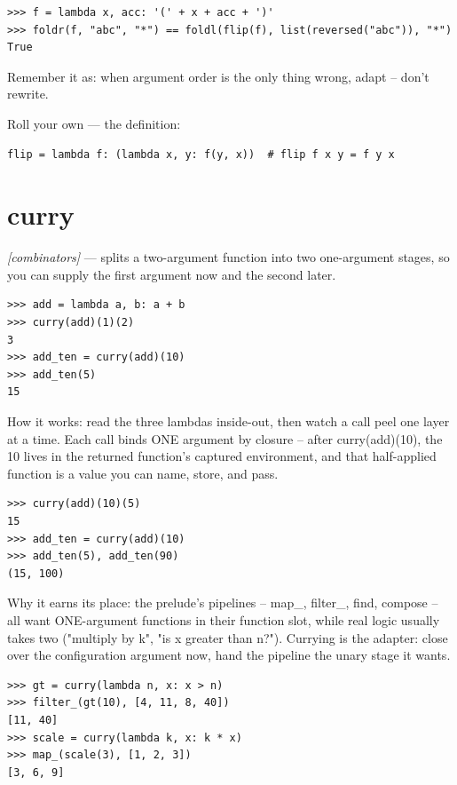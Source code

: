 \documentclass[11pt,letterpaper]{book}
\begin{document}
\begin{lstlisting}[style=spec]
>>> f = lambda x, acc: '(' + x + acc + ')'
>>> foldr(f, "abc", "*") == foldl(flip(f), list(reversed("abc")), "*")
True
\end{lstlisting}

Remember it as: when argument order is the only thing wrong, adapt -- don't rewrite.


Roll your own --- the definition:

\begin{lstlisting}[style=code]
flip = lambda f: (lambda x, y: f(y, x))  # flip f x y = f y x
\end{lstlisting}

\section{curry}
\noindent\textit{[combinators]} --- splits a two-argument function into two one-argument stages, so you can supply the first argument now and the second later.
\begin{lstlisting}[style=spec]
>>> add = lambda a, b: a + b
>>> curry(add)(1)(2)
3
>>> add_ten = curry(add)(10)
>>> add_ten(5)
15
\end{lstlisting}

How it works: read the three lambdas inside-out, then watch a call peel one layer at a time. Each call binds ONE argument by closure -- after curry(add)(10), the 10 lives in the returned function's captured environment, and that half-applied function is a value you can name, store, and pass.

\begin{lstlisting}[style=spec]
>>> curry(add)(10)(5)
15
>>> add_ten = curry(add)(10)
>>> add_ten(5), add_ten(90)
(15, 100)
\end{lstlisting}

Why it earns its place: the prelude's pipelines -- map\_, filter\_, find, compose -- all want ONE-argument functions in their function slot, while real logic usually takes two ("multiply by k", "is x greater than n?"). Currying is the adapter: close over the configuration argument now, hand the pipeline the unary stage it wants.

\begin{lstlisting}[style=spec]
>>> gt = curry(lambda n, x: x > n)
>>> filter_(gt(10), [4, 11, 8, 40])
[11, 40]
>>> scale = curry(lambda k, x: k * x)
>>> map_(scale(3), [1, 2, 3])
[3, 6, 9]
\end{lstlisting}
\end{document}
